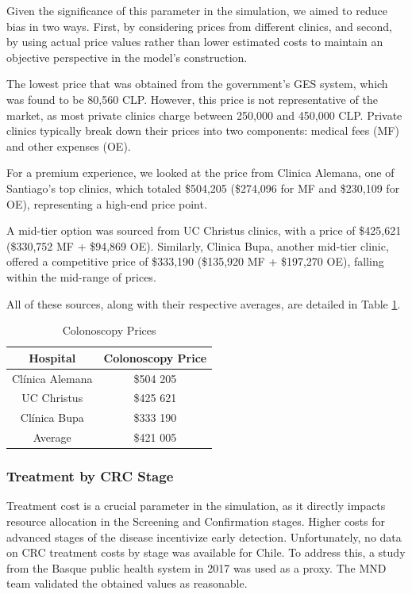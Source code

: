 Given the significance of this parameter in the simulation, we aimed to reduce bias in two ways. First, by considering prices from different clinics, and second, by using actual price values rather than lower estimated costs to maintain an objective perspective in the model's construction.

The lowest price that was obtained from the government's GES system, which was found to be 80,560 CLP. However, this price is not representative of the market, as most private clinics charge between 250,000 and 450,000 CLP. Private clinics typically break down their prices into two components: medical fees (MF) and other expenses (OE).

For a premium experience, we looked at the price from Clinica Alemana, one of Santiago's top clinics, which totaled \$504,205 (\$274,096 for MF and \$230,109 for OE), representing a high-end price point.

A mid-tier option was sourced from UC Christus clinics, with a price of \$425,621 (\$330,752 MF + \$94,869 OE). Similarly, Clinica Bupa, another mid-tier clinic, offered a competitive price of \$333,190 (\$135,920 MF + \$197,270 OE), falling within the mid-range of prices.

All of these sources, along with their respective averages, are detailed in Table \ref{table:colonoscopy_prices}.

\begin{table}[H]
\caption{Colonoscopy Prices}
\centering
\begin{tabular}{|c|c|}
\hline
Hospital & Colonoscopy Price\\ \hline
Clínica Alemana & \$504 205\\ \hline
UC Christus     & \$425 621\\ \hline
Clínica Bupa    & \$333 190\\ \hline
Average         & \$421 005\\ \hline
\end{tabular}
\label{table:colonoscopy_prices}
\end{table}




\subsubsection*{Treatment by CRC Stage}

Treatment cost is a crucial parameter in the simulation, as it directly impacts resource allocation in the Screening and Confirmation stages. Higher costs for advanced stages of the disease incentivize early detection. Unfortunately, no data on CRC treatment costs by stage was available for Chile. To address this, a study from the Basque public health system in 2017 was used as a proxy. The MND team validated the obtained values as reasonable.

